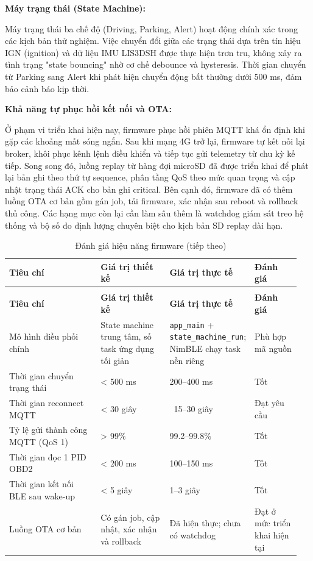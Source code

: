 \documentclass[a4paper]{extarticle}
\newcommand{\thesissettableid}[2]{%
  \renewcommand{\thetable}{#1}%
  \renewcommand{\theHtable}{#2}%
}
\begin{document}
\textbf{Máy trạng thái (State Machine):}

Máy trạng thái ba chế độ (Driving, Parking, Alert) hoạt động chính xác
trong các kịch bản thử nghiệm. Việc chuyển đổi giữa các trạng thái dựa
trên tín hiệu IGN (ignition) và dữ liệu IMU LIS3DSH được thực hiện trơn
tru, không xảy ra tình trạng "state bouncing" nhờ cơ chế debounce và
hysteresis. Thời gian chuyển từ Parking sang Alert khi phát hiện chuyển
động bất thường dưới 500 ms, đảm bảo cảnh báo kịp thời.

\textbf{Khả năng tự phục hồi kết nối và OTA:}

Ở phạm vi triển khai hiện nay, firmware phục hồi phiên MQTT khá ổn định
khi gặp các khoảng mất sóng ngắn. Sau khi mạng 4G trở lại, firmware tự
kết nối lại broker, khôi phục kênh lệnh điều khiển và tiếp tục gửi
telemetry từ chu kỳ kế tiếp. Song song đó, luồng replay từ hàng đợi
microSD đã được triển khai để phát lại bản ghi theo thứ tự sequence,
phân tầng QoS theo mức quan trọng và cập nhật trạng thái ACK cho bản ghi
critical. Bên cạnh đó, firmware đã có thêm luồng OTA cơ bản gồm gán job,
tải firmware, xác nhận sau reboot và rollback thủ công. Các hạng mục còn
lại cần làm sâu thêm là watchdog giám sát treo hệ thống và bộ số đo định
lượng chuyên biệt cho kịch bản SD replay dài hạn.


{\thesissettableid{5.2}{tab-ch5-anh-gia-hieu-nang-firmware}
\def\LTcaptype{table}
\begin{longtable}{|L{0.327\linewidth}|L{0.243\linewidth}|L{0.224\linewidth}|L{0.160\linewidth}|}
\caption{Đánh giá hiệu năng firmware}\label{tab:ch5-anh-gia-hieu-nang-firmware}\\
\hline \textbf{Tiêu chí} & \textbf{Giá trị thiết kế} & \textbf{Giá trị thực tế} & \textbf{Đánh giá} \\
\hline
\endfirsthead
\caption[]{Đánh giá hiệu năng firmware (tiếp theo)}\\
\hline \textbf{Tiêu chí} & \textbf{Giá trị thiết kế} & \textbf{Giá trị thực tế} & \textbf{Đánh giá} \\
\hline
\endhead
\hline
\endfoot
\endlastfoot
Mô hình điều phối chính & State machine trung tâm, số task ứng dụng tối
giản & \texttt{app\_main} + \nolinkurl{state_machine_run}; NimBLE chạy
task nền riêng & Phù hợp mã nguồn \\\hline
Thời gian chuyển trạng thái & \textless{} 500 ms & 200--400 ms & Tốt \\\hline
Thời gian reconnect MQTT & \textless{} 30 giây & ~15--30
giây & Đạt yêu cầu \\\hline
Tỷ lệ gửi thành công MQTT (QoS 1) & \textgreater{} 99\% & 99.2--99.8\% &
Tốt \\\hline
Thời gian đọc 1 PID OBD2 & \textless{} 200 ms & 100--150 ms & Tốt \\\hline
Thời gian kết nối BLE sau wake-up & \textless{} 5 giây & 1--3 giây &
Tốt \\\hline
Luồng OTA cơ bản & Có gán job, cập nhật, xác nhận và rollback & Đã hiện
thực; chưa có watchdog & Đạt ở mức triển khai hiện tại \\\hline
\end{longtable}
}
\end{document}
